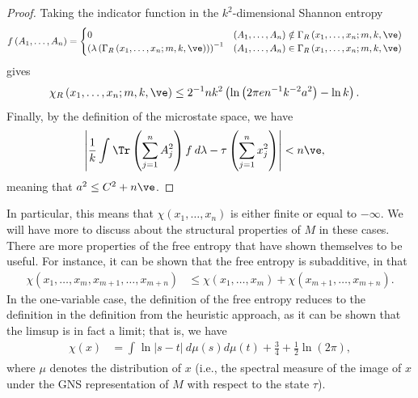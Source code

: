 \documentclass[10pt]{mypackage}
\begin{document}
\begin{proof}
  Taking the indicator function in the $k^2$-dimensional Shannon entropy
  \begin{align*}
    f\left( A_1,\dots,A_n \right) &= \begin{cases}
      0 & \left( A_1,\dots,A_n \right)\notin \Gamma_R\left( x_1,\dots,x_n;m,k,\ve \right)\\
      \left( \lambda\left( \Gamma_R\left( x_1,\dots,x_n;m,k,\ve \right) \right) \right)^{-1} & \left( A_1,\dots,A_n \right)\in \Gamma_R\left( x_1,\dots,x_n;m,k,\ve \right)
    \end{cases}
  \end{align*}
  gives
  \begin{align*}
    \chi_R\left( x_1,\dots,x_n;m,k,\ve \right) &\leq 2^{-1}nk^2\left( \ln\left( 2\pi e n^{-1}k^{-2}a^2 \right)-\ln k \right).
  \end{align*}
  Finally, by the definition of the microstate space, we have
  \begin{align*}
    \left\vert \frac{1}{k} \int_{}^{} \Tr\left( \sum_{j=1}^{n}A_j^2 \right)f\:d\lambda - \tau\left( \sum_{j=1}^{n}x_j^2 \right)\right\vert &< n\ve,
  \end{align*}
  meaning that $a^2 \leq C^2 + n\ve$.
\end{proof}
In particular, this means that $\chi\left( x_1,\dots,x_n \right)$ is either finite or equal to $-\infty$. We will have more to discuss about the structural properties of $M$ in these cases. There are more properties of the free entropy that have shown themselves to be useful. For instance, it can be shown that the free entropy is subadditive, in that
\begin{align*}
  \chi\left( x_1,\dots,x_m,x_{m+1},\dots,x_{m+n} \right) &\leq \chi\left( x_1,\dots,x_m \right) + \chi\left( x_{m+1},\dots,x_{m+n} \right).
\end{align*}
In the one-variable case, the definition of the free entropy reduces to the definition in the definition from the heuristic approach, as it can be shown that the limsup is in fact a limit; that is, we have
\begin{align*}
  \chi(x) &= \int_{}^{} \ln\left\vert s-t \right\vert\:d\mu(s)d\mu(t) + \frac{3}{4} + \frac{1}{2}\ln\left( 2\pi \right),
\end{align*}
where $\mu$ denotes the distribution of $x$ (i.e., the spectral measure of the image of $x$ under the GNS representation of $M$ with respect to the state $\tau$).
\end{document}
